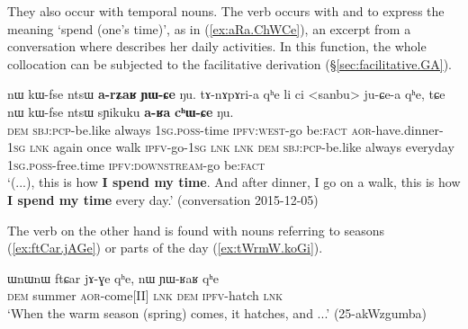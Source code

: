 They also occur with temporal nouns. The verb  occurs with  and  to express the meaning `spend (one's time)', as in (\ref{ex:aRa.ChWCe}), an excerpt from a conversation where  describes her daily activities. In this function, the whole collocation can be subjected to the facilitative  derivation (§\ref{sec:facilitative.GA}).  


\begin{exe}
\ex \label{ex:aRa.ChWCe}
\gll nɯ kɯ-fse ntsɯ \textbf{a-rʑaʁ} \textbf{ɲɯ-ɕe} ŋu. tɤ-nɤpɤri-a qʰe li ci <sanbu> ju-ɕe-a qʰe, tɕe nɯ kɯ-fse ntsɯ sɲikuku \textbf{a-ʁa} \textbf{cʰɯ-ɕe} ŋu. \\
\textsc{dem} \textsc{sbj}:\textsc{pcp}-be.like always \textsc{1sg}.\textsc{poss}-time \textsc{ipfv}:\textsc{west}-go be:\textsc{fact} \textsc{aor}-have.dinner-\textsc{1sg} \textsc{lnk} again once walk \textsc{ipfv}-go-\textsc{1sg} \textsc{lnk} \textsc{lnk} \textsc{dem} \textsc{sbj}:\textsc{pcp}-be.like always everyday \textsc{1sg}.\textsc{poss}-free.time \textsc{ipfv}:\textsc{downstream}-go be:\textsc{fact} \\
\glt `(...), this is how \textbf{I spend my time}. And after dinner, I go on a walk, this is how \textbf{I spend my time} every day.' (conversation 2015-12-05)
\end{exe}
 
 The verb  on the other hand is found with nouns referring to seasons (\ref{ex:ftCar.jAGe}) or parts of the day (\ref{ex:tWrmW.koGi}).
 
\begin{exe}
\ex \label{ex:ftCar.jAGe}
\gll  ɯnɯnɯ ftɕar jɤ-ɣe qʰe, nɯ ɲɯ-ʁaʁ qʰe \\
\textsc{dem} summer \textsc{aor}-come[II] \textsc{lnk} \textsc{dem} \textsc{ipfv}-hatch \textsc{lnk} \\
\glt `When the warm season (spring) comes, it hatches, and ...' (25-akWzgumba)
\end{exe}

